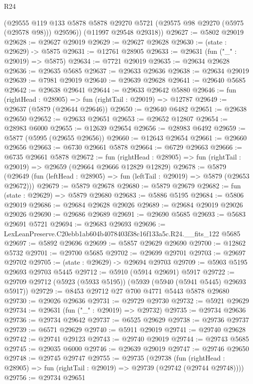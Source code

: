\begin{lexlean}{R24}
\begin{coremodule}
        (@29555 @119 @133 @5878 @5878 @29270 @5721 (@29575 @98 @29270 (@5975 (@29578 @98))) @29596))
      (@11997 @29548 @29318))
@29627 := @5802 @29019
@29628 := @29627 @29019
@29629 := @29627 @29628
@29630 := (state : @29629) -> @5875
@29631 := @12761 @28905
@29633 := @29631 (fun ("_" : @29019) => @5875)
@29634 := @7721 @29019
@29635 := @29634 @29628
@29636 := @29635 @5685
@29637 := @29633 @29636
@29638 := @29634 @29019
@29639 := @7981 @29019
@29640 := @29639 @29628
@29641 := @29640 @5685
@29642 := @29638 @29641
@29644 := @29633 @29642 @5880
@29646 := fun (rightHead : @28905) => fun (rightTail : @29019) => @12787
@29649 := @29637 (@5879 (@29644 @29646))
@29650 := @29640 @6482
@29651 := @29638 @29650
@29652 := @29633 @29651
@29653 := @29652 @12807
@29654 := @28983 @6000
@29655 := @12639 @29654
@29656 := @28983 @6492
@29659 := @5877 (@5995 (@29655 @29656))
@29660 := @12643 @29654
@29661 := @29660 @29656
@29663 := @6730 @29661 @5878
@29664 := @6729 @29663
@29666 := @6735 @29661 @5878
@29672 := fun (rightHead : @28905) =>
  fun (rightTail : @29019) => @29659 (@29664 @29666 @12829 @12829)
@29678 := @5879
    (@29649 (fun (leftHead : @28905) => fun (leftTail : @29019) => @5879 (@29653 @29672)))
@29679 := @5879 @29678
@29680 := @5879 @29679
@29682 := fun (state : @29629) => @5879 @29680
@29683 := @5886 @5195
@29684 := @5806 @29019
@29686 := @29684 @29628 @29026
@29689 := @29684 @29019 @29026 @29026
@29690 := @29686 @29689
@29691 := @29690 @5685
@29693 := @5683 @29691 @5721
@29694 := @29683 @29693
@29696 := LexLeanPreserve.C20ebb1ab604b4078403f38c16f133a5c.R24.__fits_122 @5685
@29697 := @5892 @29696
@29699 := @5857 @29629 @29690
@29700 := @12862 @5732
@29701 := @29700 @5685
@29702 := @29699 @29701
@29703 := @29697 @29702
@29705 := (state : @29629) -> @29694 @29703
@29709 := @5903 @5195 @29693 @29703 @5445
@29712 := @5910 (@5914 @29691) @5917
@29722 := @29709 @29712 (@5923 (@5933 @5195)) (@5939 (@5940 (@5941 @5445) @29693 @5917))
@29729 := @8453 @29712 @27 @700 @4771 @5443 @5878 @29680
@29730 := @29026 @29636
@29731 := @29729 @29730
@29732 := @5921 @29629
@29734 := @29631 (fun ("_" : @29019) => @29732)
@29735 := @29734 @29636
@29736 := @29734 @29642
@29737 := @6525 @29629
@29738 := @29736 @29737
@29739 := @6571 @29629
@29740 := @5911 @29019
@29741 := @29740 @29628
@29742 := @29741 @29123
@29743 := @29740 @29019
@29744 := @29743 @5685
@29745 := @29035 @6000
@29746 := @29639 @29019
@29747 := @29746 @29650
@29748 := @29745 @29747
@29755 := @29735
    (@29738
      (fun (rightHead : @28905) => fun (rightTail : @29019) => @29739 (@29742 (@29744 @29748))))
@29756 := @29734 @29651

\end{coremodule}
\end{lexlean}
